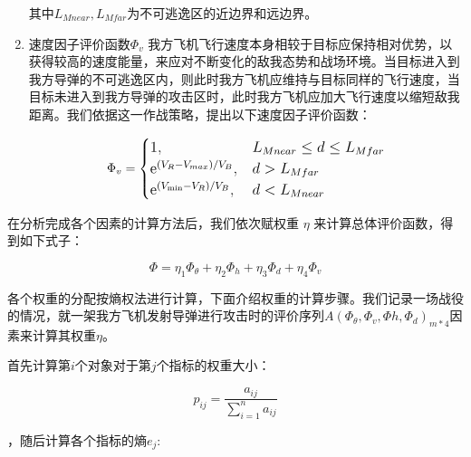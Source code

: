 \documentclass{my_paper}
\begin{document}
\begin{enumerate}
    其中$L_{Mnear},L_{Mfar}$为不可逃逸区的近边界和远边界。

    \item 速度因子评价函数$\Phi _{v}$
    我方飞机飞行速度本身相较于目标应保持相对优势，以获得较高的速度能量，来应对不断变化的敌我态势和战场环境。当目标进入到我方导弹的不可逃逸区内，则此时我方飞机应维持与目标同样的飞行速度，当目标未进入到我方导弹的攻击区时，此时我方飞机应加大飞行速度以缩短敌我距离。我们依据这一作战策略，提出以下速度因子评价函数：

    \begin{equation}
        \large\Phi_v = \begin{cases}1,&L_{Mnear}\leq d \leq L_{Mfar}\\\mathrm{e}^{\left(V_{R }-V_{max}\right) / V_{B}},&d>L_{Mfar}\\\mathrm{e}^{\left(V_{\min }-V_{R}\right) / V_{B}},&d<L_{Mnear}\end{cases}
    \end{equation}



    
    
   
    

\end{enumerate}

在分析完成各个因素的计算方法后，我们依次赋权重 $ \eta $ 来计算总体评价函数，得到如下式子：

\begin{equation}
\Phi = \eta_{1}\Phi_{\theta}+\eta_{2}\Phi_{h}+\eta_{3}\Phi_{d}+\eta_{4}\Phi_{v}
\end{equation}

各个权重的分配按熵权法进行计算，下面介绍权重的计算步骤。我们记录一场战役的情况，就一架我方飞机发射导弹进行攻击时的评价序列$A(\Phi_{\theta},\Phi_{v},\Phi{h},\Phi_{d})_{m*4}$因素来计算其权重$ \eta $。

首先计算第$ i $个对象对于第$ j $个指标的权重大小：

\begin{equation}
p_{ij} = \frac{a_{ij}}{\sum_{i=1}^{n}a_{ij}}
\end{equation}

，随后计算各个指标的熵$e_j$:
\end{document}

